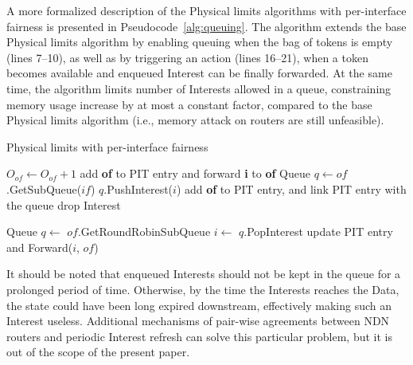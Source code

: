 A more formalized description of the Physical limits algorithms with per-interface fairness is presented in Pseudocode~\ref{alg:queuing}.
The algorithm extends the base Physical limits algorithm by enabling queuing when the bag of tokens is empty (lines 7--10), as well as by triggering an action (lines 16--21), when a token becomes available and enqueued Interest can be finally forwarded.
At the same time, the algorithm limits number of Interests allowed in a queue, constraining memory usage increase by at most a constant factor, compared to the base Physical limits algorithm (i.e., memory attack on routers are still unfeasible).




\begin{algorithm}[h]
\caption{Physical limits with per-interface fairness}
\label{alg:queuing}
\begin{algorithmic}[1]
\State{} 

\vspace{0.2cm}

     
        \State $O_{of} \leftarrow O_{of} + 1$  
        \State add \textbf{of} to PIT entry and forward \textbf{i} to \textbf{of}
    \Else
        \State Queue $q \leftarrow of$.GetSubQueue($if$)
           \State $q$.PushInterest($i$)
           \State add \textbf{of} to PIT entry, and link PIT entry with the queue
        \Else
           \State drop Interest
        \EndIf
    \EndIf
\EndFunction

\vspace{0.2cm}
\State{} 
    \State Queue $q \leftarrow$ $of$.GetRoundRobinSubQueue 
    \State $i \leftarrow$ $q$.PopInterest
    \State update PIT entry and Forward($i$, $of$)
\EndFunction
\end{algorithmic}
\end{algorithm}


It should be noted that enqueued Interests should not be kept in the queue for a prolonged period of time.
Otherwise, by the time the Interests reaches the Data, the state could have been long expired downstream, effectively making such an Interest useless.
Additional mechanisms of pair-wise agreements between NDN routers and periodic Interest refresh can solve this particular problem, but it is out of the scope of the present paper.

